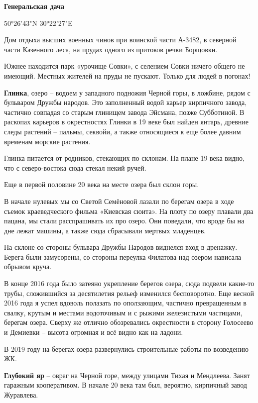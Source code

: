 \textbf{Генеральская дача} 

50°26'43"N 30°22'27"E

Дом отдыха высших военных чинов при воинской части А-3482, в северной части Казенного леса, на прудах одного из притоков речки Борщовки.

Южнее находится парк «урочище Совки», с селением Совки ничего общего не имеющий. Местных жителей на пруды не пускают. Только для людей в погонах!\\

\medskip

\textbf{Глинка}, озеро – водоем у западного подножия Черной горы, в ложбине, рядом с бульваром Дружбы народов. Это заполненный водой карьер кирпичного завода, частично совпадая со старым глинищем завода Эйсмана, позже Субботиной. В раскопах карьеров в окрестностях Глинки в 19 веке был найден янтарь, древние следы растений – пальмы, секвойи, а также относящиеся к еще более давним временам морские растения. 

Глинка питается от родников, стекающих по склонам. На плане 19 века видно, что с северо-востока сюда стекал некий ручей.

Еще в первой половине 20 века на месте озера был склон горы.

В начале нулевых мы со Светой Семёновой лазали по берегам озера в ходе съемок краеведческого фильма «Киевская сюита». На плоту по озеру плавали два пацана, мы стали расспрашивать их про озеро. Они поведали, что вроде бы на дне лежат машины, а также сюда сбрасывали мертвых младенцев.

На склоне со стороны бульвара Дружбы Народов виднелся вход в дренажку. Берега были замусорены, со стороны переулка Филатова над озером нависала обрывом круча.

В конце 2016 года было затеяно укрепление берегов озера, сюда подвели какие-то трубы, сложившийся за десятилетия рельеф изменился бесповоротно. Еще весной 2016 года я успел вдоволь полазать по оползающим, частично превращенным в свалку, крутым и местами водоточивым и с рыжими железистыми частицами, берегам озера. Сверху же отлично обозревались окрестности в сторону Голосеево и Демиевки – высота огромная и всё видно как на ладони.

В 2019 году на берегах озера развернулись строительные работы по возведению ЖК.\\

\medskip

\textbf{Глубокий яр} – овраг на Черной горе, между улицами Тихая и Мендлеева. Занят гаражным кооперативом. В начале 20 века там был, вероятно, кирпичный завод Журавлева.\\

